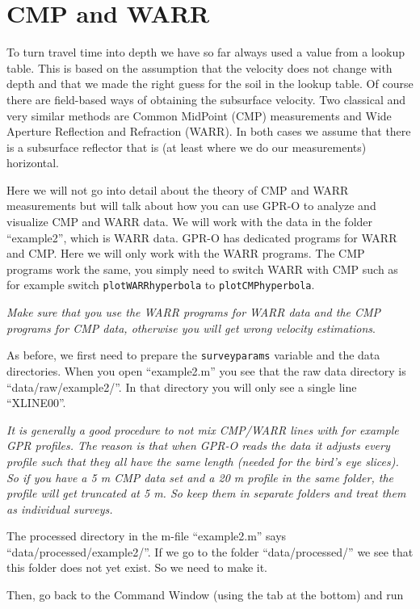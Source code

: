 \documentclass[11pt]{article}
\begin{document}
\section{CMP and WARR}

To turn travel time into depth we have so far always used a value from
a lookup table. This is based on the assumption that the velocity does
not change with depth and that we made the right guess for the soil in
the lookup table. Of course there are field-based ways of obtaining
the subsurface velocity. Two classical and very similar methods are
Common MidPoint (CMP) measurements and Wide Aperture Reflection and
Refraction (WARR). In both cases we assume that there is a subsurface
reflector that is (at least where we do our measurements) horizontal.

Here we will not go into detail about the theory of CMP and WARR
measurements but will talk about how you can use GPR-O to analyze and
visualize CMP and WARR data. We will work with the data in the folder
``example2'', which is WARR data. GPR-O has dedicated programs for
WARR and CMP. Here we will only work with the WARR programs. The CMP
programs work the same, you simply need to switch WARR with CMP such
as for example switch \verb#plotWARRhyperbola# to
\verb#plotCMPhyperbola#.

\emph{Make sure that you use the WARR programs for WARR data and the
  CMP programs for CMP data, otherwise you will get wrong velocity
  estimations}.

As before, we first need to prepare the \verb#surveyparams# variable
and the data directories. When you open ``example2.m'' you see that
the raw data directory is ``data/raw/example2/''. In that directory
you will only see a single line ``XLINE00''.

\emph{It is generally a good procedure to not mix CMP/WARR lines with
  for example GPR profiles. The reason is that when GPR-O reads the
  data it adjusts every profile such that they all have the same
  length (needed for the bird's eye slices). So if you have a 5 m CMP
  data set and a 20 m profile in the same folder, the profile will get
  truncated at 5 m. So keep them in separate folders and treat them as
  individual surveys.}

The processed directory in the m-file ``example2.m'' says
``data/processed/example2/''. If we go to the folder
``data/processed/'' we see that this folder does not yet exist. So we
need to make it.

Then, go back to the Command Window (using the tab at the bottom) and
run
\end{document}
